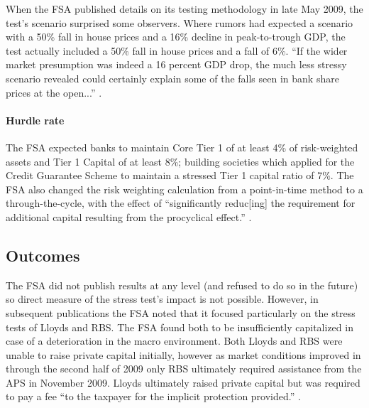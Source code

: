 \documentclass[12pt]{article}
\begin{document}
When the FSA published details on its testing methodology in late May 2009, the test's scenario surprised some observers. Where rumors had expected a scenario with a 50\% fall in house prices and a 16\% decline in peak-to-trough GDP, the test actually included a 50\% fall in house prices and a fall of 6\%. ``If the wider market presumption was indeed a 16 percent GDP drop, the much less stressy scenario revealed could certainly explain some of the falls seen in bank share prices at the open...'' \citep{Stressy}.

\paragraph{Hurdle rate}

The FSA expected banks to maintain Core Tier 1 of at least 4\% of risk-weighted assets and Tier 1 Capital of at least 8\%; building societies which applied for the Credit Guarantee Scheme to maintain a stressed Tier 1 capital ratio of 7\%. \citep{Results} The FSA also changed the risk weighting calculation from a point-in-time method to a through-the-cycle, with the effect of ``significantly reduc[ing] the requirement for additional capital resulting from the procyclical effect.'' \citep{Jan2009}.

\subsection{Outcomes}

The FSA did not publish results at any level (and refused to do so in the future) so direct measure of the stress test's impact is not possible. However, in subsequent publications the FSA noted that it focused particularly on the stress tests of Lloyds and RBS. The FSA found both to be insufficiently capitalized in case of a deterioration in the macro environment. Both Lloyds and RBS were unable to raise private capital initially, however as market conditions improved in through the second half of 2009 only RBS ultimately required assistance from the APS in November 2009. Lloyds ultimately raised private capital but was required to pay a fee ``to the taxpayer for the implicit protection provided.'' \citep{FSAReport}.
\end{document}
